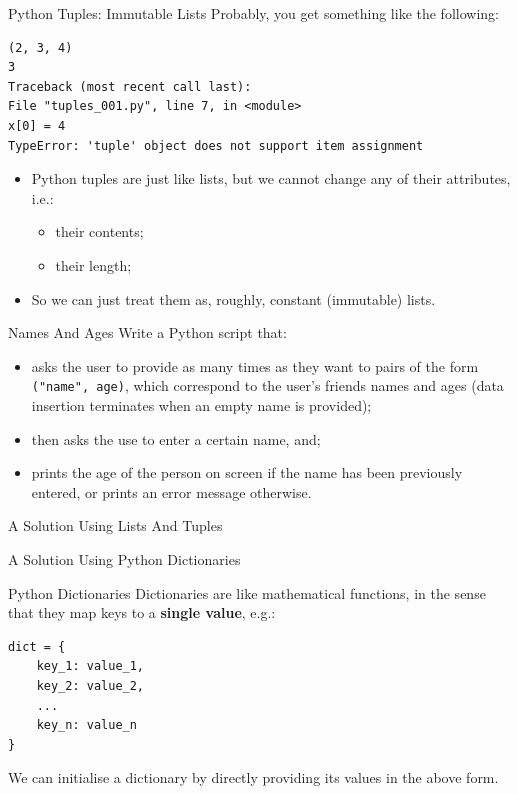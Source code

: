 \documentclass[aspectratio=169, 12pt, xcolor=table]{beamer}
\begin{document}
	\begin{frame}[fragile]{Python Tuples: Immutable Lists}
		Probably, you get something like the following:
		\begin{lstlisting}
(2, 3, 4)
3
Traceback (most recent call last):
File "tuples_001.py", line 7, in <module>
x[0] = 4
TypeError: 'tuple' object does not support item assignment
\end{lstlisting}\pause
		\begin{itemize}
			\item Python tuples are just like lists, but we cannot change any of their attributes, i.e.:
			\begin{itemize}
				\item their contents;
				\item their length;
			\end{itemize}
			\item So we can just treat them as, roughly, constant (immutable) lists.
		\end{itemize}
	\end{frame}

	\begin{frame}{Names And Ages}
		Write a Python script that:
		\begin{itemize}
			\item asks the user to provide as many times as they want to pairs of the form \texttt{("name", age)}, which correspond to the user's friends names and ages (data insertion terminates when an empty name is provided);
			\item then asks the use to enter a certain name, and;
			\item prints the age of the person on screen if the name has been previously entered, or prints an error message otherwise.
		\end{itemize}
	\end{frame}

	\begin{frame}{A Solution Using Lists And Tuples}
		
	\end{frame}
	
	\begin{frame}{A Solution Using Python Dictionaries}
		
	\end{frame}

	\begin{frame}[fragile]{Python Dictionaries}
		Dictionaries are like mathematical functions, in the sense that they map keys to a \textbf{single value}, e.g.:
		\begin{lstlisting}
dict = {
    key_1: value_1,
    key_2: value_2,
    ...
    key_n: value_n
}
\end{lstlisting}
		We can initialise a dictionary by directly providing its values in the above form.
	\end{frame}
\end{document}
